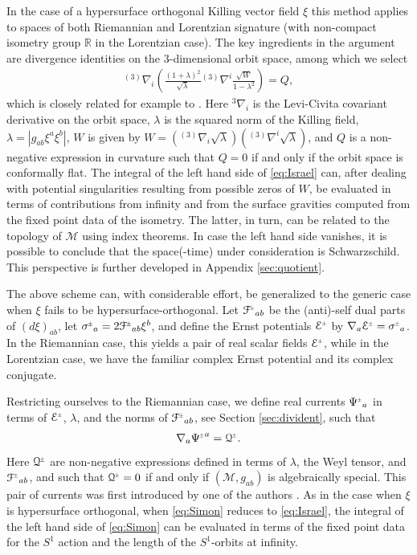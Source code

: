 \documentclass[a4paper,10pt,reqno]{amsart}
\newcommand{\cM}{\mathcal{M}}
\theoremstyle{plain}
\newcommand{\PM}[1]{{{#1}^{\hspace{-.5pt}\scaleto{\pm}{3.5pt}}}}
\def\Fcal{\mathcal{F}}
\def\Ecal{\mathcal{E}}
\def\Qcal{\mathcal{Q}}
\numberwithin{equation}{section}
\begin{document}
In the case of a hypersurface orthogonal Killing vector field $\xi$ this method applies to spaces of both Riemannian and Lorentzian signature (with non-compact isometry group $\mathbb{R}$ in the Lorentzian case). The key ingredients in the argument are divergence identities on the 3-dimensional orbit space, among which we select
\begin{align} \label{eq:Israel} 
{}^{(3)}\nabla_i 
\left( \frac{(1 + \lambda)^2}{\sqrt{\lambda}} {}^{(3)}\nabla^i \frac{\sqrt{W}}{1 - \lambda^2}\right) = Q,    
\end{align} 
which is closely related for example to \cite[Eqs. (2.12)-(2.13)]{MR398432}. Here ${}^3\nabla_i$ is the Levi-Civita covariant derivative on the orbit space, $\lambda$ is the squared norm of the Killing field, $\lambda  = |g_{ab}\xi^a \xi^b|$,  $W$ is given by $W = ({}^{(3)}\nabla_i  \sqrt{\lambda})({}^{(3)} \nabla^i \sqrt{\lambda})$, and $Q$ is a non-negative expression in curvature such that $Q = 0$ if and only if the orbit space is conformally flat. The integral of the left hand side of \eqref{eq:Israel} can, after dealing with potential singularities resulting from possible  zeros of $W$, be evaluated in terms of contributions from infinity and from the surface gravities computed from the fixed point data of the isometry. The latter, in turn, can be related to the topology of $\cM$ using index theorems. In case the left hand side vanishes, it is possible to conclude that the space(-time) under consideration is Schwarzschild. This perspective is further developed in Appendix \ref{sec:quotient}.

The above scheme can, with considerable effort, be generalized to the generic case when $\xi$ fails to be hypersurface-orthogonal. Let $\PM{\Fcal}_{ab}$ be the (anti)-self dual parts of $(d\xi)_{ab}$, let $\PM{\sigma}_{a}= 2 \PM{\Fcal}_{ab} \xi^{b}$, and define the Ernst potentials $\PM{\Ecal}$ by $\nabla_a \PM{\Ecal} = \PM{\sigma}_a$. In the Riemannian case, this yields a pair of real scalar fields $\PM{\Ecal}$, while in the Lorentzian case, we have the familiar complex Ernst potential and its complex conjugate.  

Restricting ourselves to the  Riemannian case, we define real currents $\PM{\Psi}_a$ in terms of $\PM{\Ecal}$, $\lambda$, and the norms of $\PM{\Fcal}_{ab}$, see Section \ref{sec:divident}, such that  
\begin{align} \label{eq:Simon} 
\nabla_a \PM{\Psi}^a = \PM{\Qcal}. 
\end{align} 
Here $\PM{\Qcal}$ are non-negative expressions defined in terms of $\lambda$, the Weyl tensor, and $\PM{\Fcal}_{ab}$, and such that $\PM{\Qcal} = 0$ if and only if $(\cM, g_{ab})$ is algebraically special. This pair of currents  was first introduced by one of the authors \cite{simon:1995}. As in the case when $\xi$ is hypersurface orthogonal, when \eqref{eq:Simon} reduces to \eqref{eq:Israel}, the integral of the left hand side of \eqref{eq:Simon} can be evaluated in terms of the fixed point data for the $S^1$ action and the length of the $S^1$-orbits at infinity. 
\end{document}
